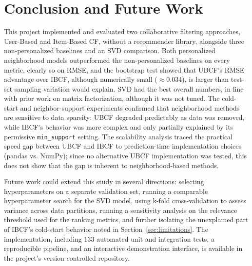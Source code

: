 \documentclass[conference]{IEEEtran}
\begin{document}
\section{Conclusion and Future Work}
\label{sec:conclusion}
This project implemented and evaluated two collaborative filtering approaches, User-Based and Item-Based CF, without a recommender library, alongside three non-personalized baselines and an SVD comparison. Both personalized neighborhood models outperformed the non-personalized baselines on every metric, clearly so on RMSE, and the bootstrap test showed that UBCF's RMSE advantage over IBCF, although numerically small ($\approx$0.034), is larger than test-set sampling variation would explain. SVD had the best overall numbers, in line with prior work on matrix factorization, although it was not tuned. The cold-start and neighbor-support experiments confirmed that neighborhood methods are sensitive to data sparsity: UBCF degraded predictably as data was removed, while IBCF's behavior was more complex and only partially explained by its permissive \texttt{min\_support} setting. The scalability analysis traced the practical speed gap between UBCF and IBCF to prediction-time implementation choices (pandas vs. NumPy); since no alternative UBCF implementation was tested, this does not show that the gap is inherent to neighborhood-based methods.

Future work could extend this study in several directions: selecting hyperparameters on a separate validation set, running a comparable hyperparameter search for the SVD model, using k-fold cross-validation to assess variance across data partitions, running a sensitivity analysis on the relevance threshold used for the ranking metrics, and further isolating the unexplained part of IBCF's cold-start behavior noted in Section~\ref{sec:limitations}. The implementation, including 133 automated unit and integration tests, a reproducible pipeline, and an interactive demonstration interface, is available in the project's version-controlled repository.
\end{document}
